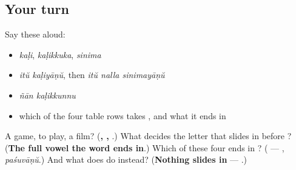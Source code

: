 \subsection*{Your turn}
Say these aloud:

\begin{itemize}
\raggedright
  \item \emph{kaḷi}, \emph{kaḷikkuka}, \emph{sinima}
  \item \emph{itŭ kaḷiyāṇŭ}, then \emph{itŭ nalla sinimayāṇŭ}
  \item \emph{ñān kaḷikkunnu}
  \item which of the four table rows takes \textbf{}, and what it ends in
\end{itemize}

\begin{tcolorbox}[breakable,colback=teal!4,colframe=teal!35!black,title={Before you move on}]
A game, to play, a film? (\textbf{, , }.) What decides the letter that slides in before \textbf{}? (\textbf{The full vowel the word ends in}.) Which of these four ends in \textbf{}? (\textbf{} — \textbf{}, \emph{paśuvāṇŭ}.) And what does \textbf{} do instead? (\textbf{Nothing slides in} — \textbf{}.)
\end{tcolorbox}
